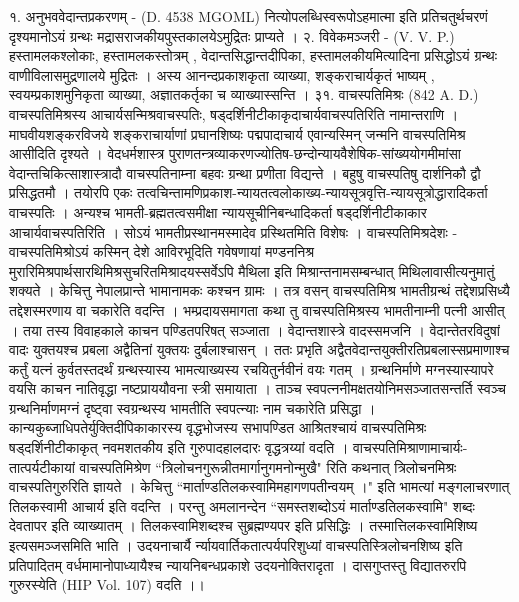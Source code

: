 १. अनुभववेदान्तप्रकरणम् - (D. 4538 MGOML)
नित्योपलब्धिस्वरूपोऽहमात्मा इति प्रतिचतुर्थचरणं दृश्यमानोऽयं ग्रन्थः मद्रासराजकीयपुस्तकालयेऽमुद्रितः प्राप्यते ।
२. विवेकमञ्जरी - (V. V. P.)
हस्तामलकश्लोकाः, हस्तामलकस्तोत्रम् , वेदान्तसिद्धान्तदीपिका, हस्तामलकीयमित्यादिना प्रसिद्धोऽयं ग्रन्थः वाणीविलासमुद्रणालये मुद्रितः । अस्य आनन्दप्रकाशकृता व्याख्या, शङ्कराचार्यकृतं भाष्यम् , स्वयम्प्रकाशमुनिकृता व्याख्या, अज्ञातकर्तृका च व्याख्यास्सन्ति ।
३१. वाचस्पतिमिश्रः (842 A. D.)
वाचस्पतिमिश्रस्य आचार्यसन्मिश्रवाचस्पतिः, षड्दर्शिनीटीकाकृदाचार्यवाचस्पतिरिति नामान्तराणि । माघवीयशङ्करविजये शङ्कराचार्याणां प्रघानशिष्यः पद्मपादाचार्य एवान्यस्मिन् जन्मनि वाचस्पतिमिश्र आसीदिति दृश्यते । वेदधर्मशास्त्र पुराणतन्त्रव्याकरणज्योतिष-छन्दोन्यायवैशेषिक-सांख्ययोगमीमांसा वेदान्तचिकित्साशास्त्रादौ वाचस्पतिनाम्ना बहवः ग्रन्था प्रणीता विद्यन्ते । बहुषु वाचस्पतिषु दार्शनिकौ द्वौ प्रसिद्धतमौ । तयोरपि एकः तत्वचिन्तामणिप्रकाश-न्यायतत्वलोकाख्य-न्यायसूत्रवृत्ति-न्यायसूत्रोद्धारादिकर्ता वाचस्पतिः । अन्यश्च भामती-ब्रह्मतत्वसमीक्षा न्यायसूचीनिबन्धादिकर्ता षड्दर्शिनीटीकाकार आचार्यवाचस्पतिरिति । सोऽयं भामतीप्रस्थानमस्मादेव प्रस्थितमिति विशेषः ।
वाचस्पतिमिश्रदेशः -
वाचस्पतिमिश्रोऽयं कस्मिन् देशे आविरभूदिति गवेषणायां मण्डननिश्र मुरारिमिश्रपार्थसारथिमिश्रसुचरितमिश्रादयस्सर्वेऽपि मैथिला इति मिश्रान्तनामसम्बन्धात् मिथिलावासीत्यनुमातुं शक्यते । केचित्तु नेपालप्रान्ते भामानामकः कश्चन ग्रामः । तत्र वसन् वाचस्पतिमिश्र भामतीग्रन्थं तद्देशप्रसिध्यै तद्देशस्मरणाय वा चकारेति वदन्ति ।
भम्प्रदायसमागता कथा तु वाचस्पतिमिश्रस्य भामतीनाम्नी पत्नी आसीत् । तया तस्य विवाहकाले काचन पण्डितपरिषत् सञ्जाता । वेदान्तशास्त्रे वादस्समजनि । वेदान्तेतरविदुषां वादः युक्तयश्च प्रबला अद्वैतिनां युक्तयः दुर्बलाश्चासन् । ततः प्रभृति अद्वैतवेदान्तयुक्तीरतिप्रबलास्सप्रमाणाश्च कर्तुं यत्नं कुर्वतस्तदर्थं ग्रन्थस्यास्य भामत्याख्यस्य रचयितुर्नवीनं वयः गतम् । ग्रन्थनिर्माणे मग्नस्यास्यापरे वयसि काचन नातिवृद्धा नष्टप्राययौवना स्त्री समायाता । ताञ्च स्वपत्ननीमक्षतयोनिमसञ्जातसन्तर्ति स्वञ्च ग्रन्थनिर्माणमग्नं दृष्ट्वा स्वग्रन्थस्य भामतीति स्वपत्न्याः नाम चकारेति प्रसिद्धा ।
कान्यकुब्जाधिपतेर्युक्तिदीपिकाकारस्य वृद्धभोजस्य सभापण्डित आश्रितश्चायं वाचस्पतिमिश्रः षड्दर्शिनीटीकाकृत् नवमशतकीय इति गुरुपादहालदारः वृद्धत्रय्यां वदति ।
वाचस्पतिमिश्राणामाचार्यः-
तात्पर्यटीकायां वाचस्पतिमिश्रेण ``त्रिलोचनगुरून्नीतमार्गानुगमनोन्मुखै" रिति कथनात् त्रिलोचनमिश्रः वाचस्पतिगुरुरिति ज्ञायते । केचित्तु ``मार्ताण्डतिलकस्वामिमहागणपतीन्वयम् ।" इति भामत्यां मङ्गलाचरणात् तिलकस्वामी आचार्य इति वदन्ति । परन्तु अमलानन्देन ``समस्तशब्दोऽयं मार्ताण्डतिलकस्वामि" शब्दः देवतापर इति व्याख्यातम् । तिलकस्वामिशब्दश्च सुब्रह्मण्यपर इति प्रसिद्धिः । तस्मात्तिलकस्वामिशिष्य इत्यसमञ्जसमिति भाति । उदयनाचार्यै र्न्यायवार्तिकतात्पर्यपरिशुध्यां वाचस्पतिस्त्रिलोचनशिष्य इति प्रतिपादितम् वर्धमामानोपाध्यायैश्च न्यायनिबन्धप्रकाशे उदयनोक्तिरादृता । दासगुप्तस्तु विद्यातरुरपि गुरुरस्येति (HIP Vol. 107) वदति ।।
